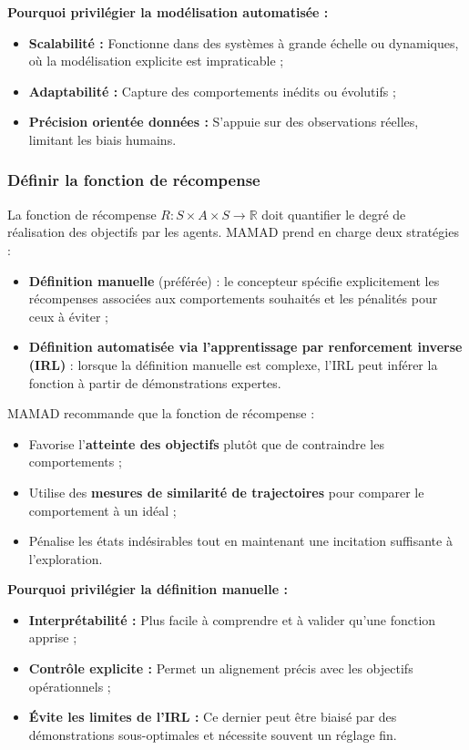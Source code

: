 \documentclass[pdflatex,sn-mathphys-num]{sn-jnl}%
\theoremstyle{thmstyleone}%
\theoremstyle{thmstyletwo}%
\theoremstyle{thmstylethree}%
\begin{document}
\vspace{0.4em}
\noindent \textbf{Pourquoi privilégier la modélisation automatisée :}
\begin{itemize}
    \item \textbf{Scalabilité :} Fonctionne dans des systèmes à grande échelle ou dynamiques, où la modélisation explicite est impraticable ;
    \item \textbf{Adaptabilité :} Capture des comportements inédits ou évolutifs ;
    \item \textbf{Précision orientée données :} S'appuie sur des observations réelles, limitant les biais humains.
\end{itemize}

\subsubsection{Définir la fonction de récompense}

La fonction de récompense $R: S \times A \times S \to \mathbb{R}$ doit quantifier le degré de réalisation des objectifs par les agents. MAMAD prend en charge deux stratégies :

\begin{itemize}
    \item \textbf{Définition manuelle} (préférée) : le concepteur spécifie explicitement les récompenses associées aux comportements souhaités et les pénalités pour ceux à éviter ;
    \item \textbf{Définition automatisée via l'apprentissage par renforcement inverse (IRL)} : lorsque la définition manuelle est complexe, l'IRL peut inférer la fonction à partir de démonstrations expertes.
\end{itemize}

MAMAD recommande que la fonction de récompense :
\begin{itemize}
    \item Favorise l'\textbf{atteinte des objectifs} plutôt que de contraindre les comportements ;
    \item Utilise des \textbf{mesures de similarité de trajectoires} pour comparer le comportement à un idéal ;
    \item Pénalise les états indésirables tout en maintenant une incitation suffisante à l'exploration.
\end{itemize}

\vspace{0.4em}
\noindent \textbf{Pourquoi privilégier la définition manuelle :}
\begin{itemize}
    \item \textbf{Interprétabilité :} Plus facile à comprendre et à valider qu'une fonction apprise ;
    \item \textbf{Contrôle explicite :} Permet un alignement précis avec les objectifs opérationnels ;
    \item \textbf{Évite les limites de l'IRL :} Ce dernier peut être biaisé par des démonstrations sous-optimales et nécessite souvent un réglage fin.
\end{itemize}
\end{document}
